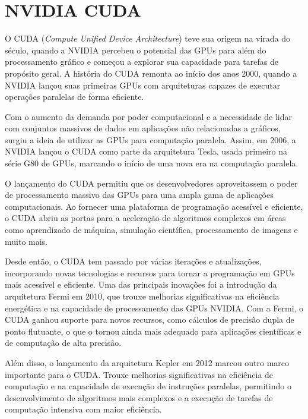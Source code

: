 \documentclass[12pt,
openright, 
oneside, %
a4paper,    %
brazil]{facom-ufu-abntex2}
\begin{document}

\section{NVIDIA CUDA}
\label{sec:cuda}

O CUDA (\textit{Compute Unified Device Architecture}) teve sua origem na virada do século, quando a NVIDIA percebeu o potencial das GPUs para além do processamento gráfico e começou a explorar sua capacidade para tarefas de propósito geral. A história do CUDA remonta ao início dos anos 2000, quando a NVIDIA lançou suas primeiras GPUs com arquiteturas capazes de executar operações paralelas de forma eficiente.


Com o aumento da demanda por poder computacional e a necessidade de lidar com conjuntos massivos de dados em aplicações não relacionadas a gráficos, surgiu a ideia de utilizar as GPUs para computação paralela. Assim, em 2006, a NVIDIA lançou o CUDA como parte da arquitetura Tesla, usada primeiro na série G80 de GPUs, marcando o início de uma nova era na computação paralela.

O lançamento do CUDA permitiu que os desenvolvedores aproveitassem o poder de processamento massivo das GPUs para uma ampla gama de aplicações computacionais. Ao fornecer uma plataforma de programação acessível e eficiente, o CUDA abriu as portas para a aceleração de algoritmos complexos em áreas como aprendizado de máquina, simulação científica, processamento de imagens e muito mais.

Desde então, o CUDA tem passado por várias iterações e atualizações, incorporando novas tecnologias e recursos para tornar a programação em GPUs mais acessível e eficiente. Uma das principais inovações foi a introdução da arquitetura Fermi em 2010, que trouxe melhorias significativas na eficiência energética e na capacidade de processamento das GPUs NVIDIA. Com a Fermi, o CUDA ganhou suporte para novos recursos, como cálculos de precisão dupla de ponto flutuante, o que o tornou ainda mais adequado para aplicações científicas e de computação de alta precisão.

Além disso, o lançamento da arquitetura Kepler em 2012 marcou outro marco importante para o CUDA. Trouxe melhorias significativas na eficiência de computação e na capacidade de execução de instruções paralelas, permitindo o desenvolvimento de algoritmos mais complexos e a execução de tarefas de computação intensiva com maior eficiência.
\end{document}
